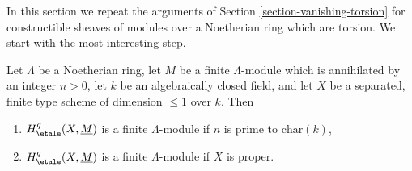 \noindent
In this section we repeat the arguments of
Section \ref{section-vanishing-torsion}
for constructible sheaves of modules over a Noetherian ring
which are torsion. We start with the most interesting step.

\begin{lemma}
\label{lemma-constant-statements-coefficients}
Let $\Lambda$ be a Noetherian ring, let $M$ be a finite $\Lambda$-module which
is annihilated by an integer $n > 0$, let $k$ be an algebraically closed field,
and let $X$ be a separated, finite type scheme of dimension $\leq 1$ over $k$.
Then
\begin{enumerate}
\item $H^q_\etale(X, \underline{M})$ is a finite $\Lambda$-module
if $n$ is prime to $\text{char}(k)$,
\item $H^q_\etale(X, \underline{M})$ is a finite $\Lambda$-module
if $X$ is proper.
\end{enumerate}
\end{lemma}

